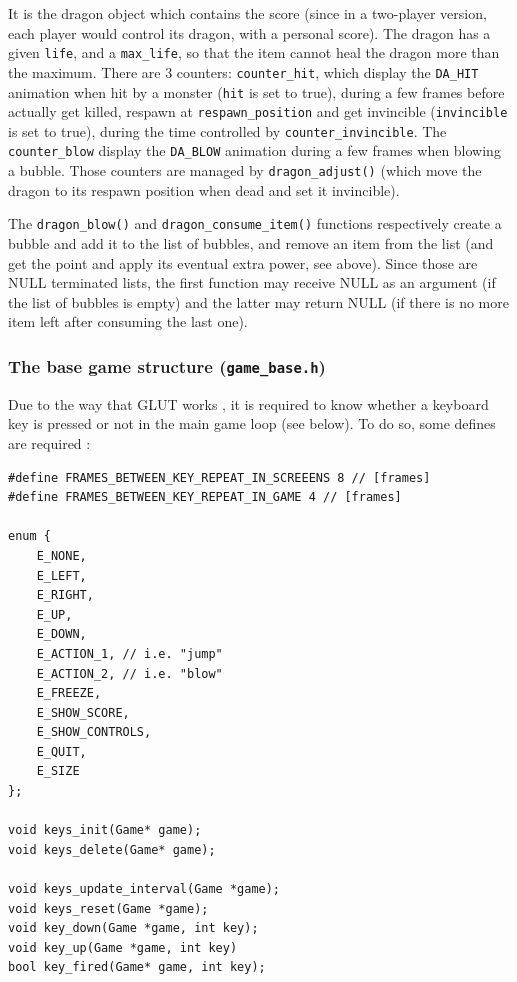 \documentclass[12pt,a4paper]{article}
\newcommand{\cc}[1]{\texttt{#1}}
\begin{document}
It is the dragon object which contains the score (since in a two-player version, each player would control its dragon, with a personal score). The dragon has a given \cc{life}, and a \cc{max_life}, so that the item cannot heal the dragon more than the maximum. There are 3 counters: \cc{counter_hit}, which display the \cc{DA_HIT} animation when hit by a monster (\cc{hit} is set to true), during a few frames before actually get killed, respawn at \cc{respawn_position} and get invincible (\cc{invincible} is set to true), during the time controlled by \cc{counter_invincible}. The \cc{counter_blow} display the \cc{DA_BLOW} animation during a few frames when blowing a bubble. Those counters are managed by \cc{dragon_adjust()} (which move the dragon to its respawn position when dead and set it invincible).

The \cc{dragon_blow()} and \cc{dragon_consume_item()} functions respectively create a bubble and add it to the list of bubbles, and remove an item from the list (and get the point and apply its eventual extra power, see above). Since those are NULL terminated lists, the first function may receive NULL as an argument (if the list of bubbles is empty) and the latter may return NULL (if there is no more item left after consuming the last one).

\subsubsection{The base game structure (\texttt{game\_base.h})}

\label{p:ekey}Due to the way that GLUT works \cite{freeglut},  it is required to know whether a keyboard key is pressed or not in the main game loop (see below). To do so, some defines are required :\begin{verbatim}
#define FRAMES_BETWEEN_KEY_REPEAT_IN_SCREEENS 8 // [frames]
#define FRAMES_BETWEEN_KEY_REPEAT_IN_GAME 4 // [frames]

enum {
    E_NONE,
    E_LEFT,
    E_RIGHT,
    E_UP,
    E_DOWN,
    E_ACTION_1, // i.e. "jump"
    E_ACTION_2, // i.e. "blow"
    E_FREEZE,
    E_SHOW_SCORE,
    E_SHOW_CONTROLS,
    E_QUIT,
    E_SIZE
};

void keys_init(Game* game);
void keys_delete(Game* game);

void keys_update_interval(Game *game);
void keys_reset(Game *game);
void key_down(Game *game, int key);
void key_up(Game *game, int key)
bool key_fired(Game* game, int key);
\end{verbatim}
\end{document}
